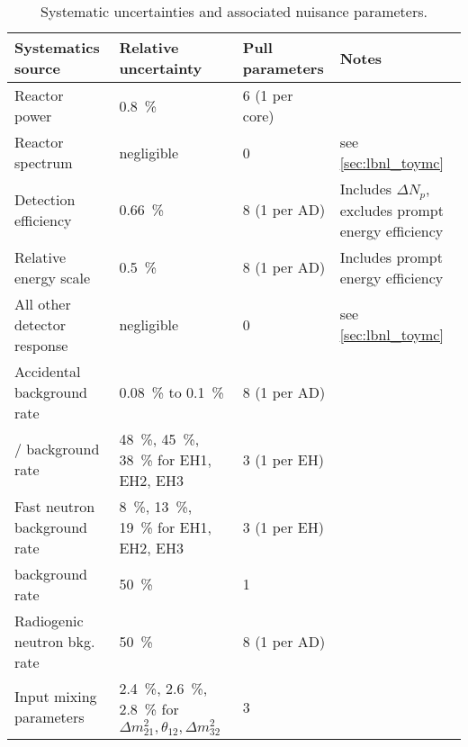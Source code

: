 \begin{table}[ht]
    \centering
    \footnotesize
    \begin{tabular}[t]{lp{3.3cm}lp{3.8cm}}
        \toprule
        Systematics source & Relative uncertainty
                          & Pull parameters
                          & Notes\\
        \midrule
        Reactor power & \SI{0.8}{\percent}
                      & 6 (1 per core) & \\
        Reactor spectrum & negligible
                         & 0
                         & see \cref{sec:lbnl_toymc} \\
        Detection efficiency & \SI{0.66}{\percent}
                             & 8 (1 per AD)
                             & Includes $\Delta N_p$, excludes prompt energy efficiency \\
        Relative energy scale & \SI{0.5}{\percent}
                              & 8 (1 per AD) & Includes prompt energy efficiency \\
        All other detector response & negligible
                                    & 0
                                    & see \cref{sec:lbnl_toymc} \\
        Accidental background rate & \SI{0.08}{\percent} to \SI{0.1}{\percent}
                                   & 8 (1 per AD)
                                   & \\
        \li{}/\he{} background rate &
        \SI{48}{\percent}, \SI{45}{\percent}, \SI{38}{\percent} for EH1, EH2, EH3
                                    & 3 (1 per EH) & \\
        Fast neutron background rate &
        \SI{8}{\percent}, \SI{13}{\percent}, \SI{19}{\percent} for EH1, EH2, EH3
                                     & 3 (1 per EH) & \\
        \amc{} background rate & \SI{50}{\percent}
                             & 1 & \\
        Radiogenic neutron bkg. rate & \SI{50}{\percent}
                                           & 8 (1 per AD) & \\
        Input mixing parameters &
        \SI{2.4}{\percent}, \SI{2.6}{\percent}, \SI{2.8}{\percent} for
        $\Delta m^2_{21},\theta_{12}, \Delta m^2_{32}$
                                & 3
                                & \\
        \bottomrule
    \end{tabular}
    \caption[Systematics summary]{Systematic uncertainties and associated nuisance parameters.}
    \label{tab:systs}
\end{table}

